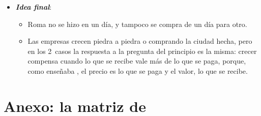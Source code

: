\documentclass[11pt]{article}
\begin{document}
\begin{itemize}
\begin{itemize}
  \item Para que las empresas españolas crezcan, ayuda más quitar las regulaciones que saltan al cruzar un umbral de tamaño, y que dejan a muchas justo por debajo\nocite{GaricanoLelargeVanReenen2016Firm,AlmuniaLopezRodriguez2018Under}, que subvencionar las fusiones.
  \end{itemize}
\item \textbf{\emph{Idea final}}:
  \begin{itemize}
  \item Roma no se hizo en un día, y tampoco se compra de un día para otro.

  \item Las empresas crecen piedra a piedra o comprando la ciudad hecha, pero en los 2~casos la respuesta a la pregunta del principio es la misma: crecer compensa cuando lo que se recibe vale más de lo que se paga, porque, como enseñaba , el precio es lo que se paga y el valor, lo que se recibe.
  \end{itemize}
\end{itemize}

\clearpage
\appendix

\section{Anexo: la matriz de }\label{anexo:ansoff}
\end{document}
